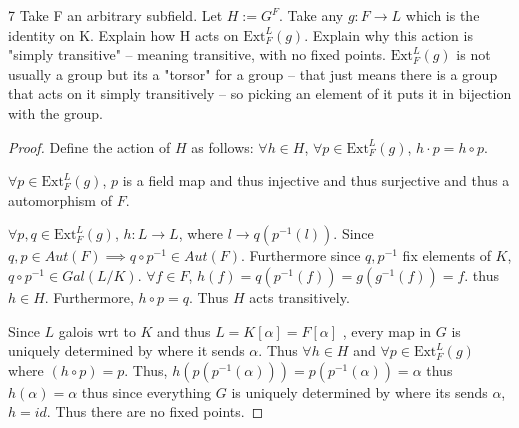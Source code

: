 \documentclass{article}
\newcommand{\ext}[2]{\text{Ext}_{#1}^{#2}}
\begin{document}
\begin{PROB}{7}\label{Problem 7.}
    Take F an arbitrary subfield. Let $H := G^F$. Take any $g: F \to L$ which is the identity on K. Explain how H acts on $\ext{F}{L}(g)$. Explain why this action is "simply transitive" -- meaning transitive, with no fixed points. $\ext{F}{L}(g)$ is not usually a group but its a "torsor" for a group -- that just means there is a group that acts on it simply transitively -- so picking an element of it puts it in bijection with the group. 
\end{PROB}
\begin{proof}
    Define the action of $H$ as follows: $\forall h \in H$, $\forall p \in \ext{F}{L}(g)$, $h \cdot p = h \circ p$.
    
    $\forall p \in \ext{F}{L}(g)$, $p$ is a field map and thus injective and thus surjective and thus a automorphism of $F$.     

    $\forall p, q \in \ext{F}{L}(g)$, $h: L \to L$, where $l \to q(p^{-1}(l))$. Since $q, p \in Aut(F) \implies q \circ p^{-1} \in Aut(F)$. Furthermore since $q, p^{-1}$ fix elements of $K$, $q \circ p^{-1} \in Gal(L / K)$. $\forall f \in F$, $h(f) = q(p^{-1}(f)) = g(g^{-1}(f)) = f$. thus $h \in H$. Furthermore, $h \circ p = q$. Thus $H$ acts transitively. 

    Since $L$ galois wrt to $K$ and thus $L = K[\alpha] = F[\alpha]$ , every map in $G$ is uniquely determined by where it sends $\alpha$. Thus $\forall h \in H$ and $\forall p \in \ext{F}{L}(g)$ where $(h \circ p) = p$. Thus, $h(p(p^{-1}(\alpha))) = p(p^{-1}(\alpha)) = \alpha$ thus $h(\alpha) = \alpha$ thus since everything $G$ is uniquely determined by where its sends $\alpha$, $h = id$. Thus there are no fixed points.              
\end{proof}

\bigskip
\end{document}
